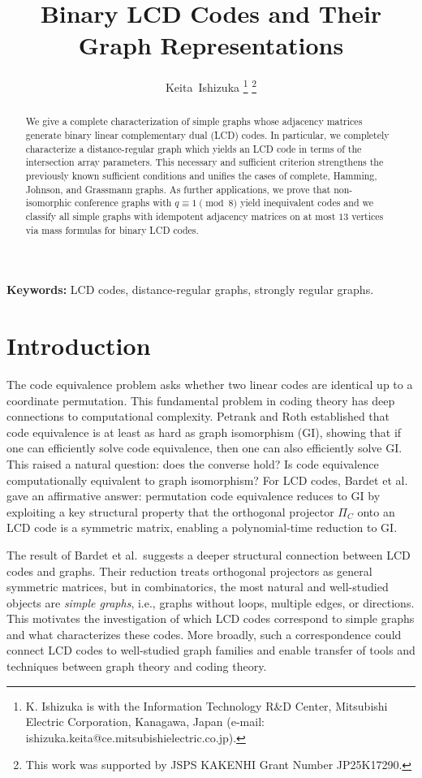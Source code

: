 \documentclass[a4paper,11pt]{article}
\title{Binary LCD Codes and Their Graph Representations}
\author{Keita~Ishizuka
\thanks{K. Ishizuka is with the Information Technology R\&D Center, Mitsubishi Electric Corporation, Kanagawa, Japan (e-mail: ishizuka.keita@ce.mitsubishielectric.co.jp).}
\thanks{This work was supported by JSPS KAKENHI Grant Number JP25K17290.}}
\date{}
\theoremstyle{remark}
\begin{document}
\maketitle

\begin{abstract}
We give a complete characterization of simple graphs whose adjacency matrices generate binary linear complementary dual (LCD) codes.
In particular, we completely characterize a distance-regular graph which yields an LCD code in terms of the intersection array parameters. This necessary and sufficient criterion strengthens the previously known sufficient conditions and unifies the cases of complete, Hamming, Johnson, and Grassmann graphs.
As further applications, we prove that non-isomorphic conference graphs with $q \equiv 1 \pmod 8$ yield inequivalent codes and we classify all simple graphs with idempotent adjacency matrices on at most $13$ vertices via mass formulas for binary LCD codes.
\end{abstract}

\medskip
\noindent\textbf{Keywords:} LCD codes, distance-regular graphs, strongly regular graphs.

\section{Introduction}

The code equivalence problem asks whether two linear codes are identical up to a coordinate permutation. This fundamental problem in coding theory has deep connections to computational complexity. Petrank and Roth \cite{petrank1997} established that code equivalence is at least as hard as graph isomorphism (GI), showing that if one can efficiently solve code equivalence, then one can also efficiently solve GI. This raised a natural question: does the converse hold? Is code equivalence computationally equivalent to graph isomorphism?
For LCD codes, Bardet et al.\ \cite{bardet2019} gave an affirmative answer: permutation code equivalence reduces to GI by exploiting a key structural property that the orthogonal projector $\Pi_C$ onto an LCD code is a symmetric matrix, enabling a polynomial-time reduction to GI.

The result of Bardet et al.\ suggests a deeper structural connection between LCD codes and graphs. Their reduction treats orthogonal projectors as general symmetric matrices, but in combinatorics, the most natural and well-studied objects are \emph{simple graphs}, i.e., graphs without loops, multiple edges, or directions. This motivates the investigation of which LCD codes correspond to simple graphs and what characterizes these codes. More broadly, such a correspondence could connect LCD codes to well-studied graph families and enable transfer of tools and techniques between graph theory and coding theory.
\end{document}
